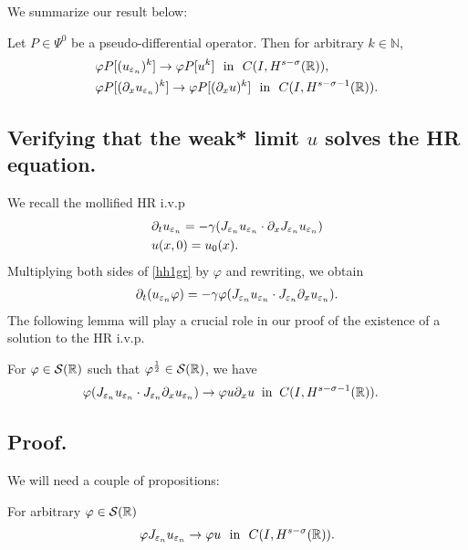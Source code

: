 		We summarize our result below:
		\begin{theorem}
		\label{hhthm:crit1}
		Let $P \in \Psi^0$ be a pseudo-differential operator. Then for
		arbitrary $k \in \mathbb{N}$, 
			\begin{equation}
			\begin{split}
				& \vp P [(u_{\ee_n})^k] \to \vp P [u^k] \ \ \text{in}  \ \ C(I,
				H^{s-\sigma }(\rr)),
				\\
				& 
				\vp P [(\p_x u_{\ee_n})^k] \to \vp P [(\p_x u)^k] \ \
				\text{in}  \ \ C(I,
				H^{s-\sigma -1}(\rr)).
				\label{hhdx_vp_u_ep_conv}
			\end{split}
		\end{equation}
	\end{theorem}
		\subsection{ Verifying that the weak* limit $u$ solves the HR equation.} 
		We recall the mollified HR i.v.p
		\begin{align}
			& \partial_t u_{\varepsilon_n}  = -\gamma(J_{\varepsilon_n} u_{\varepsilon_n} \cdot \partial_x
			J_{\varepsilon_n} u_{\varepsilon_n})
			\label{hh1gr}
			\\
			& u(x,0) = u_0(x).
			\label{hh2gr}
		\end{align}
		Multiplying both sides of \eqref{hh1gr} by $\varphi$ and rewriting,
		we obtain
		\begin{equation}
			\label{hh3}
			\begin{split}
				\partial_t(u_{\varepsilon_n} \varphi) = -\gamma \varphi (J_{\varepsilon_n} u_{\varepsilon_n} \cdot
				J_{\varepsilon_n} \partial_x u_{\varepsilon_n}).
			\end{split}
		\end{equation}
		The following lemma will play a crucial role in our proof of the
		existence of a solution to the HR i.v.p.
		\begin{lemma}
			\label{hhlem:cc}
			For $\varphi \in \mathcal{S}(\mathbb{R})$ such that
			$\varphi^\frac{1}{2} \in \mathcal{S}(\mathbb{R})$, we have
			\begin{equation}
				\begin{split}
					\label{hhburgers_and_nonlocal_conv}
				& \varphi (J_{\varepsilon_n} u_{\varepsilon_n} 
				\cdot J_{\varepsilon_n}\partial_x u_{\varepsilon_n}) 
				\to \varphi u \partial_x u \; \; 
				\text{in} \; \;
				C(I, H^{s-\sigma-1}(\mathbb{R})). 
			\end{split}
			\end{equation}
		\end{lemma}
		\subsection{ Proof.} We will need a couple of propositions:
		\begin{proposition}
			For arbitrary $\varphi \in \mathcal{S}(\mathbb{R})$
			\label{hhprop:1aa}
			\begin{equation}
				\begin{split}
					\varphi J_{\varepsilon_n} u_{\varepsilon_n} \to \varphi u \ \ \text{in} \ \
					C(I, H^{s-\sigma}(\mathbb{R})).
					\label{hh}
				\end{split}
			\end{equation}
		\end{proposition}

